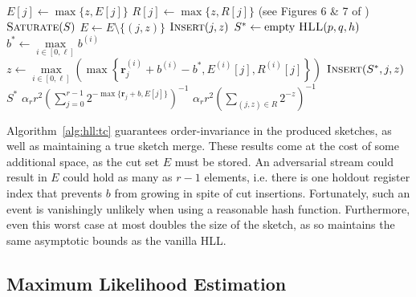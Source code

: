 \documentclass[10]{report}
\newcommand{\algoname}[1]{\textnormal{\textsc{#1}}}
\begin{document}
\begin{algorithm}[htbp]
\begin{algorithmic}[1]
				\State $E[j] \gets \max \{z, E[j]\}$
			\EndIf
		\ElsIf {$\nu = \algoname{sparse}$}
			\State $R[j] \gets \max \{z, R[j]\}$ (see Figures 6 \& 7 of \cite{heule2013hyperloglog})
				\State $\algoname{Saturate}(S)$
			\EndIf
		\EndIf
	\EndFunction
%
			\State $E \gets E \setminus \{(j, z)\}$
			\State $\algoname{Insert}(j, z)$
		\EndFor
	\EndFunction
%
%
		\State $S^* \gets \text{empty $\algoname{HLL}(p, q, h)$}$
		\For{$j \in [0,r)$} 
			\State $b^* \gets \max\limits_{i \in [0, \ell]} b^{(i)}$
			\State $z \gets  \max\limits_{ i \in [0, \ell]} \left ( \max \left \{ \mathbf{r}^{(i)}_j + b^{(i)} - b^{*}, E^{(i)}[j], R^{(i)}[j] \right \} \right )$
				\State $\algoname{Insert}(S^*, j, z)$
			\EndIf
		\EndFor
		\State \Return $S^*$
	\EndFunction
%
		\If{$\nu = \algoname{dense}$}
			\State \Return $\alpha_r r^2 \left ( \sum\limits_{j=0}^{r-1} 2^{-\max \{ \mathbf{r}_j + b, E[j]\}} \right) ^{-1}$
		\Else
			\State \Return $\alpha_r r^2 \left ( \sum\limits_{(j, z) \in R} 2^{-z} \right) ^{-1}$
		\EndIf
	\EndFunction
\end{algorithmic}
\end{algorithm}


Algorithm~\ref{alg:hll:tc} guarantees order-invariance in the produced sketches, as well as maintaining a true sketch merge.
These results come at the cost of some additional space, as the cut set $E$ must be stored.
An adversarial stream could result in $E$ could hold as many as $r-1$ elements, i.e. there is one holdout register index that prevents $b$ from growing in spite of cut insertions. 
Fortunately, such an event is vanishingly unlikely when using a reasonable hash function. 
Furthermore, even this worst case at most doubles the size of the sketch, as so maintains the same asymptotic bounds as the vanilla \algoname{HLL}.


\subsection{Maximum Likelihood Estimation}
 \label{DS:sec:HLL:MLE}
\end{document}
